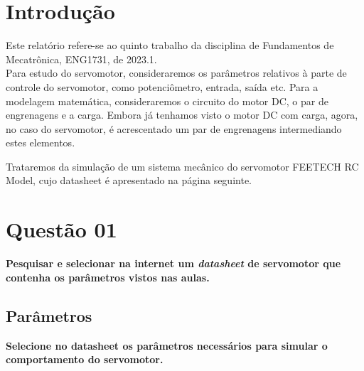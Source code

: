 \documentclass[a4paper, 12pt]{article}
\begin{document}
\newpage


\newpage

\listoffigures
\thispagestyle{empty}

\newpage

\newpage

\thispagestyle{empty}

\newpage
\section{Introdução}
Este relatório refere-se ao quinto trabalho da disciplina de Fundamentos de Mecatrônica, ENG1731, de 2023.1. \\

Para estudo do servomotor, consideraremos os parâmetros relativos à parte de controle do servomotor, como potenciômetro, entrada, saída etc. Para a modelagem matemática, consideraremos o circuito do motor DC, o par de engrenagens e a carga. Embora já tenhamos visto o motor DC com carga, agora, no caso do servomotor, é acrescentado um par de engrenagens intermediando estes elementos. 

Trataremos da simulação de um sistema mecânico do servomotor FEETECH RC Model, cujo datasheet é apresentado na página seguinte.\\

\newpage



\newpage

\section{Questão 01}
\textbf{Pesquisar e selecionar na internet um \textit{datasheet} de servomotor que contenha os parâmetros vistos nas aulas.} \\

\subsection{Parâmetros}
\textbf{Selecione no datasheet os parâmetros necessários para simular o comportamento do servomotor.} \\
\end{document}
